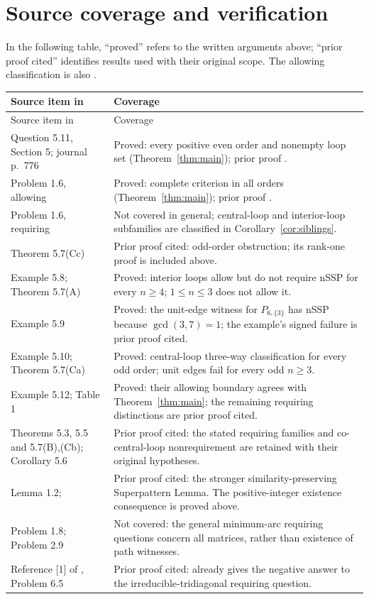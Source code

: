 \documentclass[11pt]{article}
\begin{document}
\section{Source coverage and verification}
In the following table, ``proved'' refers to the written arguments
above; ``prior proof cited'' identifies results used with their original
scope. The allowing classification is also \cite[Theorem 6.1]{C}.
{\small
\begin{longtable}{@{}>{\raggedright\arraybackslash}p{.31\linewidth}>{\raggedright\arraybackslash}p{.64\linewidth}@{}}
\toprule
Source item in \cite{KO} & Coverage\\ \midrule
\endfirsthead
\toprule Source item in \cite{KO} & Coverage\\ \midrule
\endhead
Question 5.11, Section 5; journal p.~776 & Proved: every positive even
order and nonempty loop set (Theorem~\ref{thm:main}); prior proof
\cite[Corollary 6.2]{C}.\\
Problem 1.6, allowing & Proved: complete criterion in all orders
(Theorem~\ref{thm:main}); prior proof \cite[Theorem 6.1]{C}.\\
Problem 1.6, requiring & Not covered in general; central-loop and
interior-loop subfamilies are classified in Corollary~\ref{cor:siblings}.\\
Theorem 5.7(Cc) & Prior proof cited: odd-order obstruction; its
rank-one proof is included above.\\
Example 5.8; Theorem 5.7(A) & Proved: interior loops allow but do not
require nSSP for every $n\geq4$; $1\leq n\leq3$ does not allow it.\\
Example 5.9 & Proved: the unit-edge witness for $P_{6,\{3\}}$ has
nSSP because $\gcd(3,7)=1$; the example's signed failure is prior
proof cited.\\
Example 5.10; Theorem 5.7(Ca) & Proved: central-loop three-way
classification for every odd order; unit edges fail for every
odd $n\geq3$.\\
Example 5.12; Table 1 & Proved: their allowing boundary agrees
with Theorem~\ref{thm:main}; the remaining requiring distinctions
are prior proof cited.\\
Theorems 5.3, 5.5 and 5.7(B),(Cb); Corollary 5.6 & Prior proof
cited: the stated requiring families and co-central-loop nonrequirement
are retained with their original hypotheses.\\
Lemma 1.2; \cite[Theorem 5.4]{F} & Prior proof cited: the stronger
similarity-preserving Superpattern Lemma. The positive-integer
existence consequence is proved above.\\
Problem 1.8; Problem 2.9 & Not covered: the general minimum-arc
requiring questions concern all matrices, rather than existence
of path witnesses.\\
Reference [1] of \cite{KO}, Problem 6.5 & Prior proof cited: \cite[Example 1.4]{KO}
already gives the negative answer to the irreducible-tridiagonal
requiring question.\\
\bottomrule
\end{longtable}}
\end{document}
